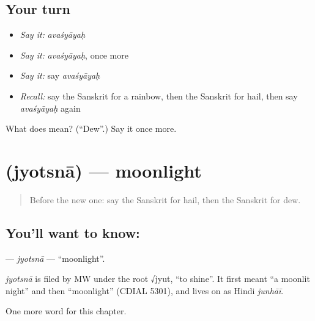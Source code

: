 \subsection*{Your turn}
\begin{itemize}
\raggedright
  \item \emph{Say it:} \emph{avaśyāyaḥ}
  \item \emph{Say it:} \emph{avaśyāyaḥ}, once more
  \item \emph{Say it:} say \emph{avaśyāyaḥ}
  \item \emph{Recall:} say the Sanskrit for a rainbow, then the Sanskrit for hail, then say \emph{avaśyāyaḥ} again
\end{itemize}

\begin{tcolorbox}[breakable,colback=teal!4,colframe=teal!35!black,title={Before you move on}]
What does  mean? (\textquotedblleft{}Dew\textquotedblright{}.) Say it once more.
\end{tcolorbox}
\section[\texorpdfstring{\sk{ज्योत्स्ना} (jyotsnā)}{ज्योत्स्ना (jyotsnā)}]{ (jyotsnā) — moonlight}

\label{lesson:SA-C197-jyotsna}



\begin{quote}
Before the new one: say the Sanskrit for hail, then the Sanskrit for dew.
\end{quote}

\subsection*{You'll want to know: }
\textbf{} — \emph{jyotsnā} — \textquotedblleft{}moonlight\textquotedblright{}.

\begin{cousinweb}
\emph{jyotsnā} is filed by MW under the root √jyut, \textquotedblleft{}to shine\textquotedblright{}. It first meant \textquotedblleft{}a moonlit night\textquotedblright{} and then \textquotedblleft{}moonlight\textquotedblright{} (CDIAL 5301), and lives on as Hindi \emph{junhāī}.
\end{cousinweb}

\begin{grammarlens}[title={What you've built}]
One more word for this chapter.
\end{grammarlens}

